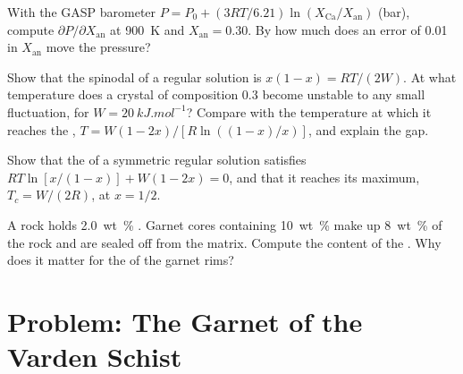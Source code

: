 \begin{exercise}[$\star\star$]\label{exo:b3:petrological-thermodynamics:9}
With the GASP barometer $P = P_0 + (3RT/6.21)\ln(X_{\text{Ca}}/X_{\text{an}})$
(bar), compute $\partial P/\partial X_{\text{an}}$ at \qty{900}{K} and
$X_{\text{an}} = 0.30$. By how much does an error of 0.01 in $X_{\text{an}}$
move the pressure?
\end{exercise}

\begin{exercise}[$\star\star\star$]\label{exo:b3:petrological-thermodynamics:10}
Show that the spinodal of a regular solution is $x(1 - x) = RT/(2W)$. At what
temperature does a crystal of composition 0.3 become unstable to any small
fluctuation, for $W = \qty{20}{kJ.mol^{-1}}$? Compare with the temperature at
which it reaches the , $T = W(1 - 2x)/[R\ln((1 - x)/x)]$, and explain
the gap.
\end{exercise}

\begin{exercise}[$\star\star\star$]\label{exo:b3:petrological-thermodynamics:11}
Show that the  of a symmetric regular solution satisfies $RT\ln[x/(1 -
x)] + W(1 - 2x) = 0$, and that it reaches its maximum, $T_c = W/(2R)$, at $x
= 1/2$.
\end{exercise}

\begin{exercise}[$\star\star\star$]\label{exo:b3:petrological-thermodynamics:12}
A rock holds \qty{2.0}{wt\percent} . Garnet cores containing
\qty{10}{wt\percent}  make up \qty{8}{wt\percent} of the rock and are
sealed off from the matrix. Compute the  content of the . Why does it matter for the  of the garnet rims?
\end{exercise}

\section{Problem: The Garnet of the Varden Schist}

